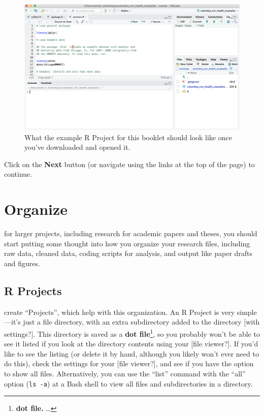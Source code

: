 \documentclass[]{tufte-book}
\begin{document}
\begin{figure}
\includegraphics[width=28.86in]{images/example_repo} \caption[What the example R Project for this booklet should look like once you've downloaded and opened it]{What the example R Project for this booklet should look like once you've downloaded and opened it.}\label{fig:examplerepo}
\end{figure}

Click on the \textbf{Next} button (or navigate using the
links at the top of the page) to continue.

\hypertarget{organize}{%
\chapter{Organize}\label{organize}}

 for larger projects, including research
for academic papers and theses, you should start putting some thought into how you
organize your research files, including raw data, cleaned data, coding scripts for
analysis, and output like paper drafts and figures.

\hypertarget{r-projects}{%
\section{R Projects}\label{r-projects}}

 create ``Projects'', which help with this
organization. An R Project is very simple---it's just a file directory, with an
extra subdirectory added to the directory {[}with settings?{]}. This directory is
saved as a \textbf{dot file}\footnote{\textbf{dot file.} \ldots{}}, so you probably won't be able to see it
listed if you look at the directory contents using your {[}file viewer?{]}. If you'd like
to see the listing (or delete it by hand, although you likely won't ever need to
do this), check the settings for your {[}file viewer?{]}, and see if you have the option
to show all files. Alternatively, you can use the ``list'' command with the ``all'' option
(\texttt{ls\ -a}) at a Bash shell to view all files and subdirectories in a directory.
\end{document}
